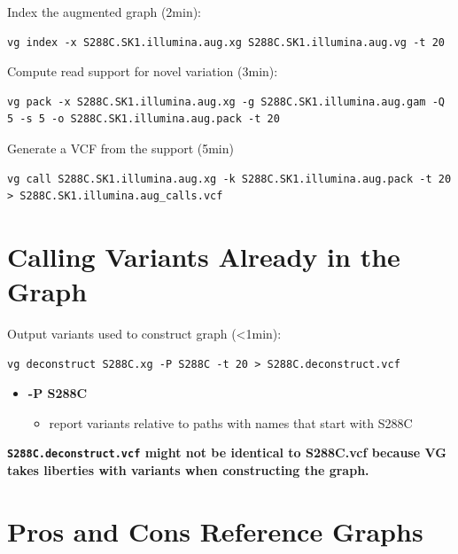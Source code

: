 \documentclass[
]{book}
\providecommand{\tightlist}{%
  \setlength{\itemsep}{0pt}\setlength{\parskip}{0pt}}
\begin{document}
Index the augmented graph (2min):

\begin{verbatim}
vg index -x S288C.SK1.illumina.aug.xg S288C.SK1.illumina.aug.vg -t 20
\end{verbatim}

Compute read support for novel variation (3min):

\begin{verbatim}
vg pack -x S288C.SK1.illumina.aug.xg -g S288C.SK1.illumina.aug.gam -Q 5 -s 5 -o S288C.SK1.illumina.aug.pack -t 20
\end{verbatim}

Generate a VCF from the support (5min)

\begin{verbatim}
vg call S288C.SK1.illumina.aug.xg -k S288C.SK1.illumina.aug.pack -t 20 > S288C.SK1.illumina.aug_calls.vcf
\end{verbatim}

\hypertarget{calling-variants-already-in-the-graph}{%
\section{Calling Variants Already in the Graph}\label{calling-variants-already-in-the-graph}}

Output variants used to construct graph (\textless1min):

\begin{verbatim}
vg deconstruct S288C.xg -P S288C -t 20 > S288C.deconstruct.vcf
\end{verbatim}

\begin{itemize}
\tightlist
\item
  \textbf{-P S288C}

  \begin{itemize}
  \tightlist
  \item
    report variants relative to paths with names that start with S288C
  \end{itemize}
\end{itemize}

\textbf{\texttt{S288C.deconstruct.vcf} might not be identical to S288C.vcf because VG takes liberties with variants when constructing the graph.}

\hypertarget{pros-and-cons-reference-graphs}{%
\section{Pros and Cons Reference Graphs}\label{pros-and-cons-reference-graphs}}
\end{document}
